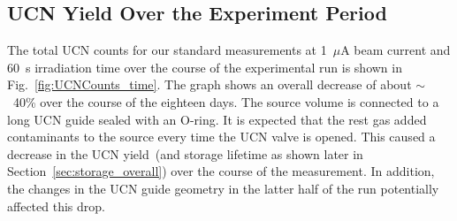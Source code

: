

\subsection{UCN Yield Over the Experiment Period}

The total UCN counts for our standard measurements at 1~$\mu$A beam
current and 60~s irradiation time over the course of the experimental
run is shown in Fig.~\ref{fig:UCNCounts_time}. The graph shows an
overall decrease of about $\sim$~40\% over the course of the eighteen
days. The source volume is connected to a long UCN guide sealed with
an O-ring. It is expected that the rest gas added contaminants to the
source every time the UCN valve is opened. This caused a decrease in
the UCN yield~(and storage lifetime as shown later in
Section~\ref{sec:storage_overall}) over the course of the
measurement. In addition, the changes in the UCN guide geometry in the
latter half of the run potentially affected this drop.


